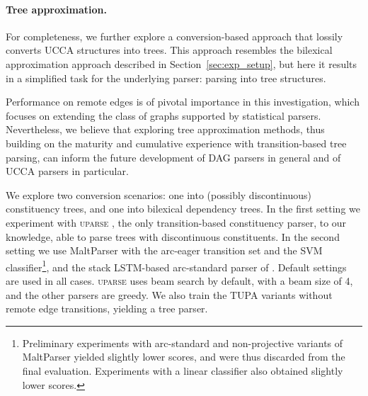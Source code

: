\documentclass[11pt,a4paper]{article}
\newcommand{\parser}[1]{TUPA\textsubscript{#1}}
\newcommand{\secref}[1]{Section~\ref{#1}}
\begin{document}
\paragraph{Tree approximation.}
For completeness, we further explore a conversion-based approach that
lossily converts UCCA structures into trees. 
This approach resembles the bilexical approximation approach described in \secref{sec:exp_setup}, but here it results in a simplified task for the underlying parser: parsing into tree structures.

Performance on remote edges is of pivotal importance in this investigation, which focuses on extending the class of graphs supported by statistical parsers. Nevertheless, we believe that exploring tree approximation methods, thus building on the maturity and cumulative experience with transition-based tree parsing, can inform the future development of DAG parsers in general and of UCCA parsers in particular.

We explore two conversion scenarios: one into (possibly discontinuous) constituency trees,
and one into bilexical dependency trees. In the first setting we experiment with \textsc{uparse}
\cite{maier-lichte:2016:DiscoNLP},
the only transition-based constituency parser, to our knowledge, able to parse trees with
discontinuous constituents.
In the second setting we use MaltParser \cite{nivre2007maltparser} with the
arc-eager transition set and the SVM classifier\footnote{Preliminary
experiments with arc-standard and non-projective variants of MaltParser yielded slightly
lower scores, and were thus discarded from the final evaluation.
Experiments with a linear classifier also obtained slightly lower scores.},
and the stack LSTM-based arc-standard parser of \citet{dyer2015transition}.
Default settings are used in all cases.
\textsc{uparse} uses beam search by default,
with a beam size of 4, and the other parsers are greedy.
We also train the \parser{} variants without remote edge transitions, yielding a tree parser.
\end{document}
